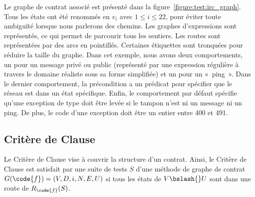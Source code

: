 %
Le graphe de contrat associé est présenté dans la
figure~\ref{figure:test:irc_graph}. Tous les états ont été renommés en $v_i$
avec $1 \leq i \leq 22$, pour éviter toute ambiguïté lorsque nous parlerons des
chemins. Les graphes d'expressions sont représentés, ce qui permet de parcourir
tous les sentiers. Les routes sont représentées par des arcs en
pointillés. Certaines étiquettes sont tronquées pour réduire la taille du
graphe. Dans cet exemple, nous avons deux comportements, un pour un message
privé ou public (représenté par une expression régulière à travers le domaine
réaliste  sous sa forme simplifiée) et un pour un «~ping~». Dans le
dernier comportement, la précondition a un prédicat pour spécifier que le réseau
est dans un état spécifique. Enfin, le comportement par défaut spécifie qu'une
exception de type 
doit être levée si le tampon n'est ni un message ni un ping. De plus, le code
d'une exception doit être un entier entre 400 et 491.

\subsection{Critère de Clause}

Le Critère de Clause vise à couvrir la structure d'un contrat. Ainsi, le Critère
de Clause est satisfait par une suite de tests $S$ d'une méthode  de
graphe de contrat $G(\code{f}) = (V, D, i, N, E, U)$ si tous les états de $V
\bslash{}U$ sont dans une route de $R_\code{f}(S)$.

